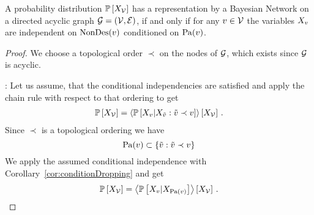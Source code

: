 \begin{theorem}\label{the:condIndBN}
	A probability distribution $\mathbb{P}\left[X_{\mathcal{V}}\right]$ has a representation by a Bayesian Network on a directed acyclic graph $\mathcal{G}=(\mathcal{V},\mathcal{E})$, if and only if for any $v\in\mathcal{V}$ the variables $X_{v}$ are independent on $\mathrm{NonDes}(v)$ conditioned on $\mathrm{Pa}(v)$.
\end{theorem}
\begin{proof}
	We choose a topological order $\prec$ on the nodes of $\mathcal{G}$, which exists since $\mathcal{G}$ is acyclic.
	
	\proofrightsymbol:
	Let us assume, that the conditional independencies are satisfied and apply the chain rule with respect to that ordering to get
	\begin{align*}
		\mathbb{P}\left[X_{\mathcal{V}}\right] =
		\left\langle 
			\mathbb{P}\left[X_{v}|X_{\tilde{v}} : \tilde{v} \prec v\right]
		\right\rangle \left[ X_{\mathcal{V}} \right] \, .
	\end{align*}
	Since $\prec$ is a topological ordering we have
		\[ \mathrm{Pa}(v) \subset \{\tilde{v} : \tilde{v} \prec v\} \]
	We apply the assumed conditional independence with Corollary~\ref{cor:conditionDropping} and get
	\begin{align*}
		\mathbb{P}\left[X_{\mathcal{V}}\right] =
		\left\langle 
			\mathbb{P}\left[X_{v}|X_{\mathrm{Pa}(v)}\right]
		\right\rangle \left[ X_{\mathcal{V}} \right] \, .
	\end{align*}
	

\end{proof}
